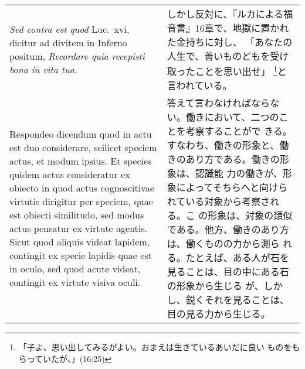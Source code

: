 \documentclass[10pt]{jsarticle} %
\begin{document}
\begin{longtable}{p{21em}p{21em}}
\\

{\it Sed contra est quod} Luc.~{\sc xvi}, dicitur ad divitem in
Inferno positum, {\it Recordare quia recepisti bona in vita tua}.

&しかし反対に、『ルカによる福音書』16章で、地獄に置かれた金持ちに対し、
「あなたの人生で、善いものどもを受け取ったことを思い出せ」
\footnote{「子よ、思い出してみるがよい。おまえは生きているあいだに良い
ものをもらっていたが、」(16:25)}と言われている。

\\


{\sc Respondeo dicendum} quod in actu est duo considerare, scilicet
speciem actus, et modum ipsius. Et species quidem actus consideratur
ex obiecto in quod actus cognoscitivae virtutis dirigitur
per speciem, quae est obiecti similitudo, sed modus actus pensatur
ex virtute agentis. Sicut quod aliquis videat lapidem, contingit ex
specie lapidis quae est in oculo, sed quod acute videat, contingit ex
virtute visiva oculi.


&

答えて言わなければならない。働きにおいて、二つのことを考察することがで
きる。すなわち、働きの形象と、働きのあり方である。働きの形象は、認識能
力の働きが、形象によってそちらへと向けられている対象から考察される。こ
の形象は、対象の類似である。他方、働きのあり方は、働くものの力から測ら
れる。たとえば、ある人が石を見ることは、目の中にある石の形象から生じる
が、しかし、鋭くそれを見ることは、目の見る力から生じる。



\end{longtable}
\end{document}

